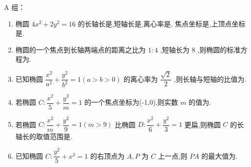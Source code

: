 A 组：
\begin{enumerate}
    
    \item 椭圆 $4{x}^{2} + 2{y}^{2} = {16}$ 的长轴长是,短轴长是,离心率是, 焦点坐标是,上顶点坐标是.

    \item 椭圆的一个焦点到长轴两端点的距离之比为 $1 : 4$ ,短轴长为 8 ,则椭圆的标准方程为.

    \item 已知椭圆 $\dfrac{{x}^{2}}{{a}^{2}} + \dfrac{{y}^{2}}{{b}^{2}} = 1\left( {a > b > 0}\right)$ 的离心率为 $\dfrac{\sqrt{2}}{2}$ ,则长轴与短轴的比值为.

    \item 若椭圆 $C : \dfrac{{x}^{2}}{5} + \dfrac{{y}^{2}}{m} = 1$ 的一个焦点坐标为(-1,0),则实数 $m$ 的值为.

    \item 若椭圆 $C : \dfrac{{x}^{2}}{m} + \dfrac{{y}^{2}}{9} = 1\left( {m > 9}\right)$ 比椭圆 $D : \dfrac{{x}^{2}}{6} + \dfrac{{y}^{2}}{3} = 1$ 更扁,则椭圆 $C$ 的长轴长的取值范围是.

    \item 已知椭圆 $C : \dfrac{{y}^{2}}{5} + {x}^{2} = 1$ 的右顶点为 ${A},P$ 为 $C$ 上一点,则 ${PA}$ 的最大值为.
\end{enumerate}

